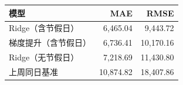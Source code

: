 \begin{tabular}{lrr}
\toprule
模型 & MAE & RMSE \\
\midrule
Ridge（含节假日） & 6,465.04 & 9,443.72 \\
梯度提升（含节假日） & 6,736.41 & 10,170.16 \\
Ridge（无节假日） & 7,218.69 & 11,430.80 \\
上周同日基准 & 10,874.82 & 18,407.86 \\
\bottomrule
\end{tabular}

